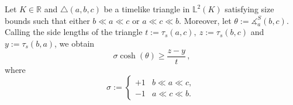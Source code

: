 \documentclass[10pt,a4paper]{amsart}
\newcommand{\ma}{\measuredangle}
\begin{document}
\begin{lem}
\label{lem:firstvargeq}
     Let $K\in\mathbb R$ and $\triangle(a, b, c)$ be a timelike triangle in $\mathbb L^2(K)$ satisfying size bounds such that either $b\ll a\ll c$ or $a\ll c\ll b$. Moreover, let $\theta:=\ma^S_a(b,c)$. Calling the side lengths of the triangle $t:=\tau_s(a,c),\ z:=\tau_s(b,c)$ and $y:=\tau_s(b,a)$, we obtain
    \begin{equation*}
        \sigma\cosh(\theta)\geq\frac{z-y}{t} \, ,
    \end{equation*}
    where 
    \[\sigma:=\begin{cases}
    +1 & b\ll a\ll c,\\
    -1 & a\ll c\ll b.
\end{cases}\ \]
\end{lem}
\end{document}

